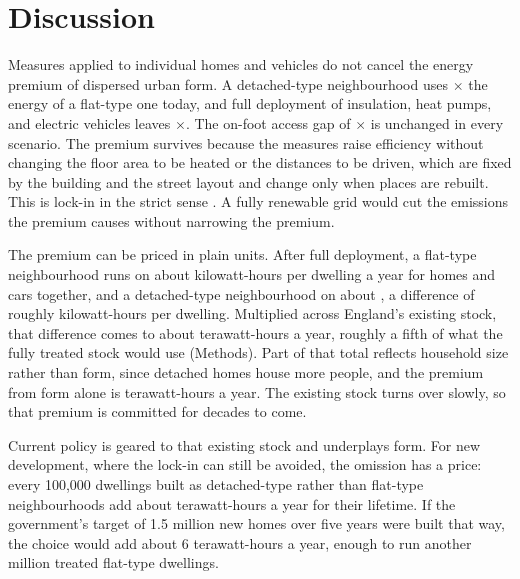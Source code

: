 \documentclass[pdflatex,sn-nature]{sn-jnl}
\begin{document}
\section*{Discussion}

Measures applied to individual homes and vehicles do not cancel the energy premium of dispersed urban form. A detached-type neighbourhood uses \nepitotalGap$\times$ the energy of a flat-type one today, and full deployment of insulation, heat pumps, and electric vehicles leaves \nepifullGap$\times$. The on-foot access gap of \nepiwalkAmenRound$\times$ is unchanged in every scenario. The premium survives because the measures raise efficiency without changing the floor area to be heated or the distances to be driven, which are fixed by the building and the street layout and change only when places are rebuilt. This is lock-in in the strict sense \citep{unruh2000,seto2016}. A fully renewable grid would cut the emissions the premium causes without narrowing the premium.

The premium can be priced in plain units. After full deployment, a flat-type neighbourhood runs on about \nepifullFlatKwh{} kilowatt-hours per dwelling a year for homes and cars together, and a detached-type neighbourhood on about \nepifullDetKwh, a difference of roughly \nepifullPremiumKwh{} kilowatt-hours per dwelling. Multiplied across England's existing stock, that difference comes to about \nepistockPremiumTwh{} terawatt-hours a year, roughly a fifth of what the fully treated stock would use (Methods). Part of that total reflects household size rather than form, since detached homes house more people, and the premium from form alone is \nepistockFamPremiumTwh{} terawatt-hours a year. The existing stock turns over slowly, so that premium is committed for decades to come.

Current policy is geared to that existing stock and underplays form. For new development, where the lock-in can still be avoided, the omission has a price: every 100,000 dwellings built as detached-type rather than flat-type neighbourhoods add about \nepifullPremiumHundredK{} terawatt-hours a year for their lifetime. If the government's target of 1.5 million new homes over five years were built that way, the choice would add about 6 terawatt-hours a year, enough to run another million treated flat-type dwellings. %
\end{document}
